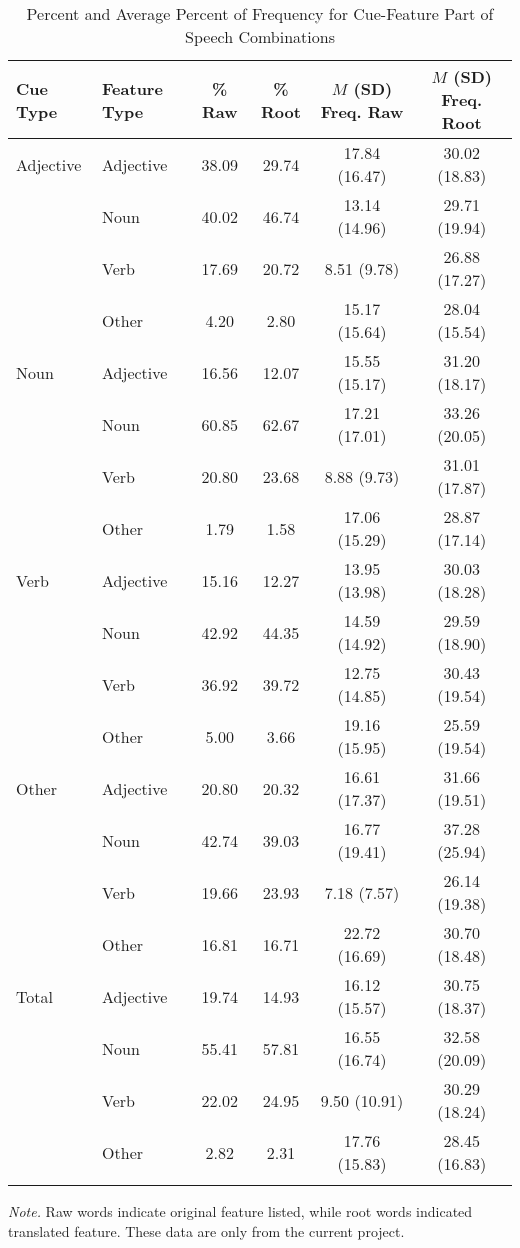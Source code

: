 \documentclass[english,,man]{apa6}
\theoremstyle{definition}
\theoremstyle{definition}
\theoremstyle{definition}
\theoremstyle{remark}
\begin{document}
\begin{table}[tbp]
\begin{center}
\begin{threeparttable}
\caption{\label{tab:percent-table}Percent and Average Percent of Frequency for Cue-Feature Part of Speech Combinations}
\begin{tabular}{llcccc}
\toprule
Cue Type & Feature Type & \% Raw & \% Root & $M$ (SD) Freq. Raw & $M$ (SD) Freq. Root\\
\midrule
Adjective & Adjective & 38.09 & 29.74 & 17.84 (16.47) & 30.02 (18.83)\\
 & Noun & 40.02 & 46.74 & 13.14 (14.96) & 29.71 (19.94)\\
 & Verb & 17.69 & 20.72 & 8.51 (9.78) & 26.88 (17.27)\\
 & Other & 4.20 & 2.80 & 15.17 (15.64) & 28.04 (15.54)\\
Noun & Adjective & 16.56 & 12.07 & 15.55 (15.17) & 31.20 (18.17)\\
 & Noun & 60.85 & 62.67 & 17.21 (17.01) & 33.26 (20.05)\\
 & Verb & 20.80 & 23.68 & 8.88 (9.73) & 31.01 (17.87)\\
 & Other & 1.79 & 1.58 & 17.06 (15.29) & 28.87 (17.14)\\
Verb & Adjective & 15.16 & 12.27 & 13.95 (13.98) & 30.03 (18.28)\\
 & Noun & 42.92 & 44.35 & 14.59 (14.92) & 29.59 (18.90)\\
 & Verb & 36.92 & 39.72 & 12.75 (14.85) & 30.43 (19.54)\\
 & Other & 5.00 & 3.66 & 19.16 (15.95) & 25.59 (19.54)\\
Other & Adjective & 20.80 & 20.32 & 16.61 (17.37) & 31.66 (19.51)\\
 & Noun & 42.74 & 39.03 & 16.77 (19.41) & 37.28 (25.94)\\
 & Verb & 19.66 & 23.93 & 7.18 (7.57) & 26.14 (19.38)\\
 & Other & 16.81 & 16.71 & 22.72 (16.69) & 30.70 (18.48)\\
Total & Adjective & 19.74 & 14.93 & 16.12 (15.57) & 30.75 (18.37)\\
 & Noun & 55.41 & 57.81 & 16.55 (16.74) & 32.58 (20.09)\\
 & Verb & 22.02 & 24.95 & 9.50 (10.91) & 30.29 (18.24)\\
 & Other & 2.82 & 2.31 & 17.76 (15.83) & 28.45 (16.83)\\
\bottomrule
\addlinespace
\end{tabular}
\begin{tablenotes}[para]
\normalsize{\textit{Note.} Raw words indicate original feature listed, while root words indicated translated feature. These data are only from the current project.}
\end{tablenotes}
\end{threeparttable}
\end{center}
\end{table}
\end{document}
